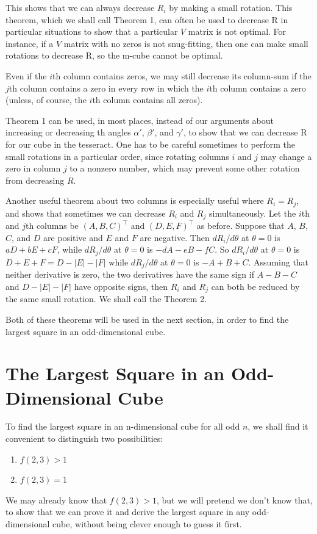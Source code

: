 This shows that we can always decrease $R_i$ by making a small rotation.  This
theorem, which we shall call Theorem 1, can often be used to decrease R in
particular situations to show that a particular $V$ matrix is not optimal.
For instance, if a $V$ matrix with no zeros is not snug-fitting, then one can
make small rotations to decrease R, so the m-cube cannot be optimal.

Even if the $i$th column contains zeros, we may still decrease its column-sum
if the $j$th column contains a zero in every row in which the $i$th column
contains a zero (unless, of course, the $i$th column contains all zeros).

Theorem 1 can be used, in most places, instead of our arguments about
increasing or decreasing th angles $\alpha'$, $\beta'$, and $\gamma'$, to show
that we can decrease R for our cube in the tesseract.  One has to be careful
sometimes to perform the small rotations in a particular order, since rotating
columns $i$ and $j$ may change a zero in column $j$ to a nonzero number, which
may prevent some other rotation from decreasing $R$.

Another useful theorem about two columns is especially useful where $R_i =
R_j$, and shows that sometimes we can decrease $R_i$ and $R_j$ simultaneously.
Let the $i$th and $j$th columns be $(A, B, C)^\top$ and $(D, E, F)^\top$
as before.  Suppose that $A$, $B$, $C$, and $D$ are positive and $E$ and $F$
are negative.  Then $d R_i/d \theta$ at $\theta = 0$ is $a D + b E + c F$,
while $d R_j/d \theta$ at $\theta = 0$ is $-d A - e B - f C$.  So $d R_i/d
\theta$ at $\theta = 0$ is $D + E + F = D - |E| - |F|$ while $d R_j/d \theta$
at $\theta = 0$ is $- A + B + C$. Assuming that neither derivative is zero,
the two derivatives have the same sign if $A - B - C$ and $D - |E| - |F|$ have
opposite signs, then $R_i$ and $R_j$ can both be reduced by the same small
rotation.  We shall call the Theorem 2.

Both of these theorems will be used in the next section, in order to find the
largest square in an odd-dimensional cube.

\section*{The Largest Square in an Odd-Dimensional Cube}
\label{refpage18}

To find the largest square in an n-dimensional cube for all odd $n$, we shall
find it convenient to distinguish two possibilities:
\begin{enumerate}
\item{$f(2,3) > 1$}
\item{$f(2,3) = 1$}
\end{enumerate}
We may already know that $f(2,3) > 1$, but we will pretend we don't know that,
to show that we can prove it and derive the largest square in any
odd-dimensional cube, without being clever enough to guess it first.

